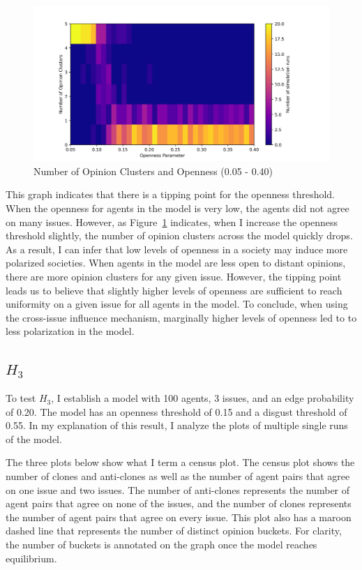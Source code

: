 \begin{figure}
\centering
\includegraphics[width=1.0\columnwidth]{./Graphs/Cluster_opensmall.png}
\caption{Number of Opinion Clusters and Openness (0.05 - 0.40)}
\label{H2b_plot_small}
\end{figure}

This graph indicates that there is a tipping point for the openness threshold.
When the openness for agents in the model is very low, the agents did not agree
on many issues. However, as Figure~\ref{H2b_plot_small} indicates, when I
increase the openness threshold slightly, the number of opinion clusters across
the model quickly drops. As a result, I can infer that low levels of openness
in a society may induce more polarized societies. When agents in the model are
less open to distant opinions, there are more opinion clusters for any given
issue. However, the tipping point leads us to believe that slightly higher
levels of openness are sufficient to reach uniformity on a given issue for all
agents in the model. To conclude, when using the cross-issue influence
mechanism, marginally higher levels of openness led to to less polarization in
the model.

\subsection{$H_{3}$}

To test $H_{3}$, I establish a model with 100 agents, 3 issues, and an edge
probability of 0.20. The model has an openness threshold of 0.15 and a disgust threshold of 0.55. In my explanation of this result, I analyze the plots of multiple single runs of the model. 

The three plots below show what I term a census plot. The census plot shows the number of clones and anti-clones as well as the number of agent pairs that agree on one issue and two issues. The number of anti-clones represents the number of agent pairs that agree on none of the issues, and the number of clones represents the number of agent pairs that agree on every issue. This plot also has a maroon dashed line that represents the number of distinct opinion buckets. For clarity, the number of buckets is annotated on the graph once the model reaches equilibrium.


